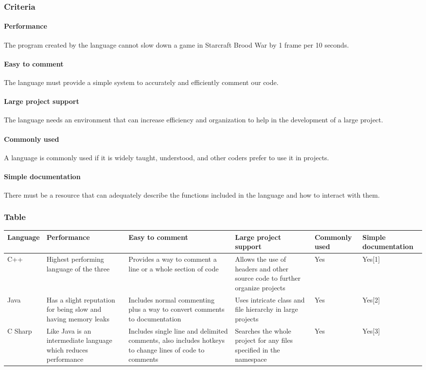 \subsubsection{Criteria}
\paragraph{Performance}
The program created by the language cannot slow down a game in Starcraft Brood War by 1 frame per 10 seconds.

\paragraph{Easy to comment}
The language must provide a simple system to accurately and efficiently comment our code.

\paragraph{Large project support}
The language needs an environment that can increase efficiency and organization to help in the development of a large project.

\paragraph{Commonly used}
A language is commonly used if it is widely taught, understood, and other coders prefer to use it in projects.

\paragraph{Simple documentation}
There must be a resource that can adequately describe the functions included in the language and how to interact with them.

\subsubsection{Table}
\begin{center}
\begin{tabular}{ ||B|M|M|M|M|M|| } 
\hline
Language & Performance & Easy to comment & Large project support & Commonly used & Simple documentation\\
 \hline
 C++ & Highest performing language of the three & Provides a way to comment a line or a whole section of code & Allows the use of headers and other source code to further organize projects & Yes & Yes[1]\\ 
 \hline
 Java & Has a slight reputation for being slow and having memory leaks & Includes normal commenting plus a way to convert comments to documentation & Uses intricate class and file hierarchy in large projects & Yes & Yes[2]\\ 
 \hline
 C Sharp & Like Java is an intermediate language which reduces performance & Includes single line and delimited comments, also includes hotkeys to change lines of code to comments & Searches the whole project for any files specified in the namespace & Yes & Yes[3]\\ 
 \hline
\end{tabular}
\end{center}

